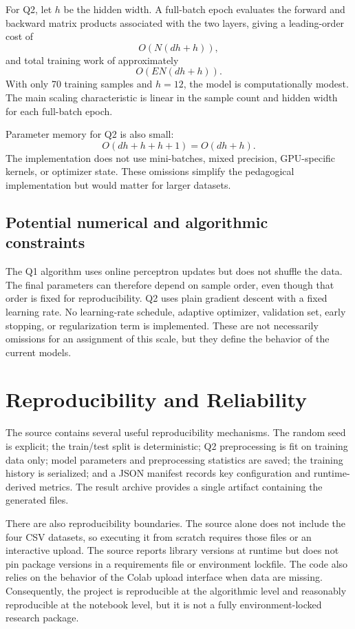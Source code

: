 \documentclass[11pt,a4paper]{article}
\begin{document}
For Q2, let \(h\) be the hidden width. A full-batch epoch evaluates the forward and backward matrix products associated with the two layers, giving a leading-order cost of
\begin{equation}
    O\!\left(N(dh+h)\right),
\end{equation}
and total training work of approximately
\begin{equation}
    O\!\left(EN(dh+h)\right).
\end{equation}
With only 70 training samples and \(h=12\), the model is computationally modest. The main scaling characteristic is linear in the sample count and hidden width for each full-batch epoch.

Parameter memory for Q2 is also small:
\begin{equation}
    O(dh+h+h+1)=O(dh+h).
\end{equation}
The implementation does not use mini-batches, mixed precision, GPU-specific kernels, or optimizer state. These omissions simplify the pedagogical implementation but would matter for larger datasets.

\subsection{Potential numerical and algorithmic constraints}
The Q1 algorithm uses online perceptron updates but does not shuffle the data. The final parameters can therefore depend on sample order, even though that order is fixed for reproducibility. Q2 uses plain gradient descent with a fixed learning rate. No learning-rate schedule, adaptive optimizer, validation set, early stopping, or regularization term is implemented. These are not necessarily omissions for an assignment of this scale, but they define the behavior of the current models.

\section{Reproducibility and Reliability}
The source contains several useful reproducibility mechanisms. The random seed is explicit; the train/test split is deterministic; Q2 preprocessing is fit on training data only; model parameters and preprocessing statistics are saved; the training history is serialized; and a JSON manifest records key configuration and runtime-derived metrics. The result archive provides a single artifact containing the generated files.

There are also reproducibility boundaries. The source alone does not include the four CSV datasets, so executing it from scratch requires those files or an interactive upload. The source reports library versions at runtime but does not pin package versions in a requirements file or environment lockfile. The code also relies on the behavior of the Colab upload interface when data are missing. Consequently, the project is reproducible at the algorithmic level and reasonably reproducible at the notebook level, but it is not a fully environment-locked research package.
\end{document}
